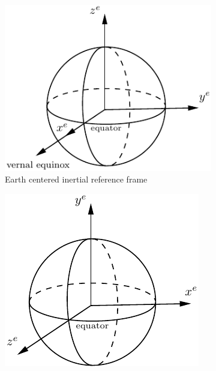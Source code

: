 \begin{figure}[H]
     \centering
     \begin{subfigure}[b]{0.4\textwidth}
         \centering
         \includegraphics[width=\textwidth]{Figures/ECI.pdf}
         \caption{Earth centered inertial reference frame}
         \label{fig:ECI}
     \end{subfigure}
     \hfill
     \begin{subfigure}[b]{0.4\textwidth}
         \centering
         \includegraphics[width=\textwidth]{Figures/ECEF.pdf}

\end{subfigure}
\end{figure}
